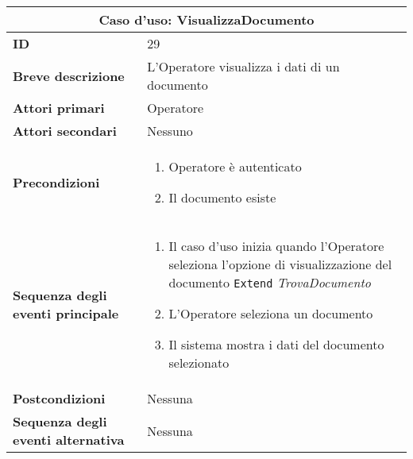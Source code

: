 \documentclass[a4paper]{report}
\begin{document}
\clearpage
\begin{table}[H]
\vspace*{-0cm}
\renewcommand{\arraystretch}{1.9}
\begin{tabular}{|p{3.9cm}|p{9.9cm}|}
\hline
\multicolumn{2}{|c|}{\textbf{Caso d’uso: VisualizzaDocumento}} \\ \hline
	\textbf{ID} & 29 \\ \hline
	\textbf{Breve descrizione} & L’Operatore visualizza i dati di un documento \\ \hline
	\textbf{Attori primari} & Operatore \\ \hline
	\textbf{Attori secondari} & Nessuno \\ \hline
	\textbf{Precondizioni} & \begin{enumerate}[leftmargin=14pt,label=\arabic*.,labelsep=0.5em,topsep=0pt,partopsep=0pt,parsep=0pt,itemsep=0pt]
        \item Operatore è autenticato
        \item Il documento esiste
    \end{enumerate} \\ \hline
	\textbf{Sequenza degli eventi principale} &
    \begin{enumerate}[leftmargin=14pt,label=\arabic*.,labelsep=0.5em,topsep=0pt,partopsep=0pt,parsep=0pt,itemsep=0pt]
        \item Il caso d’uso inizia quando l’Operatore seleziona l'opzione di visualizzazione del documento
        \newline \texttt{Extend} \textit{TrovaDocumento}
        \item L'Operatore seleziona un documento
        \item Il sistema mostra i dati del documento selezionato
    \end{enumerate} \\ \hline
	\textbf{Postcondizioni} & Nessuna \\ \hline
	\textbf{Sequenza degli eventi alternativa} & Nessuna \\ \hline
\end{tabular}
\end{table}
\end{document}
